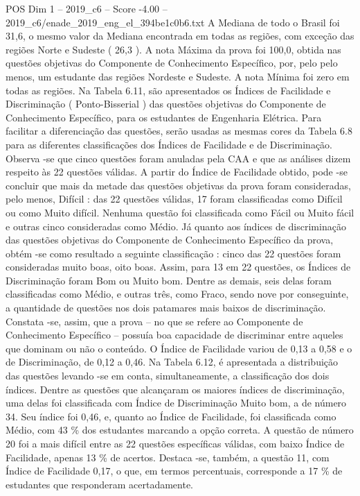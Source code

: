 \begin{textsample}{POS Dim 1 – 2019\_c6 – Score -4.00 – 2019\_c6/enade\_2019\_eng\_el\_394be1c0b6.txt}
A Mediana de todo o Brasil foi 31,6, o mesmo valor da Mediana encontrada em todas as regiões, com exceção das regiões Norte e Sudeste ( 26,3 ).
A nota Máxima da prova foi 100,0, obtida nas questões objetivas do Componente de Conhecimento Específico, por, pelo pelo menos, um estudante das regiões Nordeste e Sudeste.
A nota Mínima foi zero em todas as regiões.
Na Tabela 6.11, são apresentados os Índices de Facilidade e Discriminação ( Ponto-Bisserial ) das questões objetivas do Componente de Conhecimento Específico, para os estudantes de Engenharia Elétrica.
Para facilitar a diferenciação das questões, serão usadas as mesmas cores da Tabela 6.8 para as diferentes classificações dos Índices de Facilidade e de Discriminação.
Observa -se que cinco questões foram anuladas pela CAA e que as análises dizem respeito às 22 questões válidas.
A partir do Índice de Facilidade obtido, pode -se concluir que mais da metade das questões objetivas da prova foram consideradas, pelo menos, Difícil : das 22 questões válidas, 17 foram classificadas como Difícil ou como Muito difícil.
Nenhuma questão foi classificada como Fácil ou Muito fácil e outras cinco consideradas como Médio.
Já quanto aos índices de discriminação das questões objetivas do Componente de Conhecimento Específico da prova, obtém -se como resultado a seguinte classificação : cinco das 22 questões foram consideradas muito boas, oito boas.
Assim, para 13 em 22 questões, os Índices de Discriminação foram Bom ou Muito bom.
Dentre as demais, seis delas foram classificadas como Médio, e outras três, como Fraco, sendo nove por conseguinte, a quantidade de questões nos dois patamares mais baixos de discriminação.
Constata -se, assim, que a prova – no que se refere ao Componente de Conhecimento Específico – possuía boa capacidade de discriminar entre aqueles que dominam ou não o conteúdo.
O Índice de Facilidade variou de 0,13 a 0,58 e o de Discriminação, de 0,12 a 0,46.
Na Tabela 6.12, é apresentada a distribuição das questões levando -se em conta, simultaneamente, a classificação dos dois índices.
Dentre as questões que alcançaram os maiores índices de discriminação, uma delas foi classificada com Índice de Discriminação Muito bom, a de número 34.
Seu índice foi 0,46, e, quanto ao Índice de Facilidade, foi classificada como Médio, com 43 \% dos estudantes marcando a opção correta.
A questão de número 20 foi a mais difícil entre as 22 questões específicas válidas, com baixo Índice de Facilidade, apenas 13 \% de acertos.
Destaca -se, também, a questão 11, com Índice de Facilidade 0,17, o que, em termos percentuais, corresponde a 17 \% de estudantes que responderam acertadamente.

\end{textsample}
